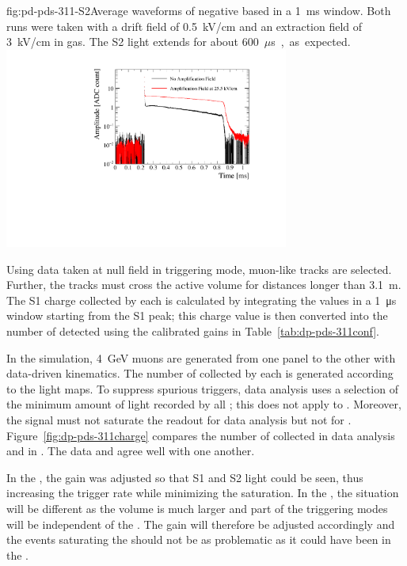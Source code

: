 \begin{dunefigure}{fig:pd-pds-311-S2}{Average waveforms of negative based  in a \SI{1}{ms} window. Both runs were taken with a drift field of \SI{0.5}{kV/cm} and an extraction field of \SI{3}{kV/cm} in gas. The S2 light extends for about \SI{600}{$\mu$s}, as expected.}
\includegraphics[width=0.7\textwidth]{graphics/dppd_311_S2_extraction.pdf}
\end{dunefigure}
Using data taken at null field in  triggering mode, muon-like tracks are selected. Further, the tracks must cross the active volume for distances longer than \SI{3.1}{\m}. 
The S1 charge collected by each  is calculated by integrating the  values in a \SI{1}{\us} window starting from the S1 peak; this charge value is then converted into the number of detected  using the calibrated  gains in Table~\ref{tab:dp-pds-311conf}.

In the simulation, \SI{4}{\GeV} muons are generated from one  panel to the other with data-driven kinematics. The number of  collected by each  is generated according to the light maps. To suppress spurious triggers, data analysis uses a selection of the minimum amount of light recorded by all ; this does not apply to . Moreover, the  signal must not saturate the readout %
for data analysis but not for . Figure~\ref{fig:dp-pds-311charge} compares the number of  collected in data analysis and in . The data and  agree well with one another. 

In the , the  gain was adjusted so that S1 and S2 light could be seen, thus increasing the trigger rate while minimizing the   saturation. 
In the , the situation will be different as the volume is much larger and part of the triggering modes will be independent of the . 
The  gain will therefore be adjusted accordingly and the events saturating the  should not be as problematic as it could have been in the .

